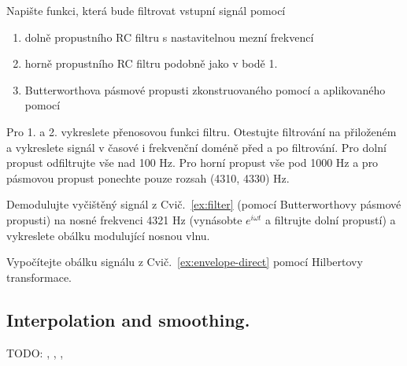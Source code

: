 \begin{exercise}
    \label{ex:filter}
    Napište funkci, která bude filtrovat vstupní signál pomocí
    \begin{enumerate}
        \item dolně propustního RC filtru s nastavitelnou mezní frekvencí
        \item horně propustního RC filtru podobně jako v bodě 1.
        \item Butterworthova pásmové propusti zkonstruovaného pomocí  a aplikovaného pomocí 
    \end{enumerate}

    Pro 1. a 2. vykreslete přenosovou funkci filtru. Otestujte filtrování na přiloženém  a vykreslete signál v časové i frekvenční doméně před a po filtrování. Pro dolní propust odfiltrujte vše nad 100 Hz. Pro horní propust vše pod 1000 Hz a pro pásmovou propust ponechte pouze rozsah (4310, 4330) Hz.
\end{exercise}


\begin{exercise}
    \label{ex:envelope-direct}
    Demodulujte vyčištěný signál z Cvič.~\ref{ex:filter} (pomocí Butterworthovy pásmové propusti) na nosné frekvenci 4321 Hz (vynásobte $e^{i\omega t}$ a filtrujte dolní propustí) a vykreslete obálku modulující nosnou vlnu.
\end{exercise}

\begin{exercise}
    \label{ex:envelope-hilbert}
    Vypočítejte obálku signálu z Cvič.~\ref{ex:envelope-direct} pomocí Hilbertovy transformace.
\end{exercise}

\subsection{Interpolation and smoothing.}

TODO: , , , 